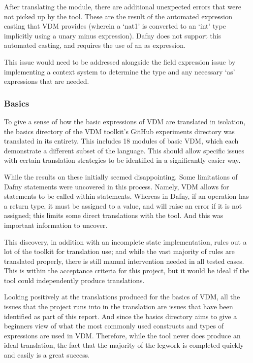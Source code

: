 \documentclass{entcs}
\begin{document}
After translating the module, there are additional unexpected errors that were not picked up by the tool. These are the result of the automated expression casting that VDM provides (wherein a `nat1' is converted to an `int' type implicitly using a unary minus expression). Dafny does not support this automated casting, and requires the use of an as expression.

This issue would need to be addressed alongside the field expression issue by implementing a context system to determine the type and any necessary `as' expressions that are needed.

\subsubsection{Basics}

To give a sense of how the basic expressions of VDM are translated in isolation, the basics directory of the VDM toolkit's GitHub experiments directory was translated in its entirety. This includes 18 modules of basic VDM, which each demonstrate a different subset of the language. This should allow specific issues with certain translation strategies to be identified in a significantly easier way.

While the results on these initially seemed disappointing. Some limitations of Dafny statements were uncovered in this process. Namely, VDM allows for statements to be called within statements. Whereas in Dafny, if an operation has a return type, it must be assigned to a value, and will raise an error if it is not assigned; this limits some direct translations with the tool. And this was important information to uncover.

This discovery, in addition with an incomplete state implementation, rules out a lot of the toolkit for translation use; and while the vast majority of rules are translated properly, there is still manual intervention needed in all tested cases. This is within the acceptance criteria for this project, but it would be ideal if the tool could independently produce translations. 

Looking positively at the translations produced for the basics of VDM, all the issues that the project runs into in the translation are issues that have been identified as part of this report. And since the basics directory aims to give a beginners view of what the most commonly used constructs and types of expressions are used in VDM. Therefore, while the tool never does produce an ideal translation, the fact that the majority of the legwork is completed quickly and easily is a great success. 
\end{document}

